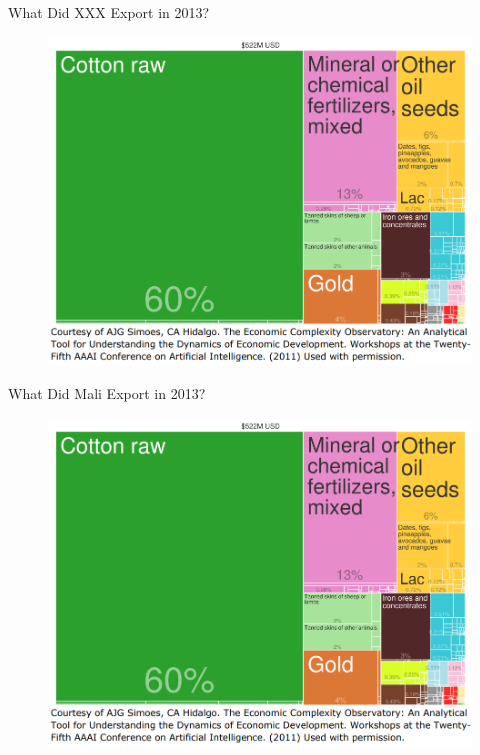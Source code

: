 \documentclass[10pt,hyperref={CJKbookmarks=true},xcolor=dvipsnames,aspectratio=169]{beamer}
\begin{document}
\begin{frame}{What Did XXX Export in 2013?}


\begin{figure}
\includegraphics[scale=0.35]{fig/gravity/com2-5.PNG}
\end{figure}

\end{frame}

\begin{frame}{What Did Mali Export in 2013?}


\begin{figure}
\includegraphics[scale=0.35]{fig/gravity/com2-5.PNG}
\end{figure}

\end{frame}
\end{document}

